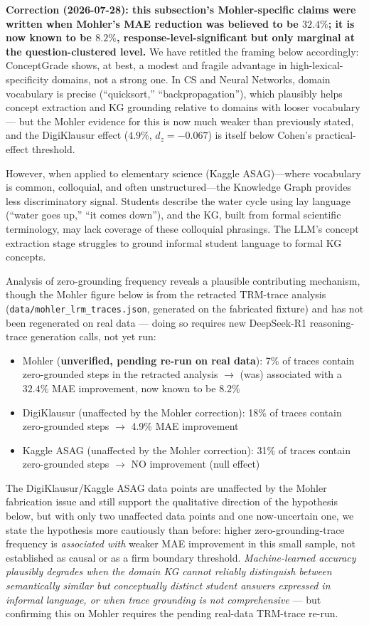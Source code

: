 \documentclass[journal,review]{vgtc}
\begin{document}
\textbf{Correction (2026-07-28): this subsection's Mohler-specific claims
were written when Mohler's MAE reduction was believed to be $32.4\%$; it
is now known to be $8.2\%$, response-level-significant but only marginal
at the question-clustered level.} We have retitled the framing below
accordingly: ConceptGrade shows, at best, a modest and fragile advantage
in high-lexical-specificity domains, not a strong one. In CS and Neural
Networks, domain vocabulary is precise (``quicksort,'' ``backpropagation''),
which plausibly helps concept extraction and KG grounding relative to
domains with looser vocabulary --- but the Mohler evidence for this is
now much weaker than previously stated, and the DigiKlausur effect
($4.9\%$, $d_z=-0.067$) is itself below Cohen's practical-effect
threshold.

However, when applied to elementary science (Kaggle ASAG)---where vocabulary is common, colloquial, and often unstructured---the Knowledge Graph provides less discriminatory signal. Students describe the water cycle using lay language (``water goes up,'' ``it comes down''), and the KG, built from formal scientific terminology, may lack coverage of these colloquial phrasings. The LLM's concept extraction stage struggles to ground informal student language to formal KG concepts.

Analysis of zero-grounding frequency reveals a plausible contributing mechanism, though the Mohler figure below is from the retracted TRM-trace analysis (\texttt{data/mohler\_lrm\_traces.json}, generated on the fabricated fixture) and has not been regenerated on real data --- doing so requires new DeepSeek-R1 reasoning-trace generation calls, not yet run:
\begin{itemize}
  \item Mohler (\textbf{unverified, pending re-run on real data}): 7\% of traces contain zero-grounded steps in the retracted analysis $\rightarrow$ (was) associated with a $32.4\%$ MAE improvement, now known to be $8.2\%$
  \item DigiKlausur (unaffected by the Mohler correction): 18\% of traces contain zero-grounded steps $\rightarrow$ 4.9\% MAE improvement
  \item Kaggle ASAG (unaffected by the Mohler correction): 31\% of traces contain zero-grounded steps $\rightarrow$ NO improvement (null effect)
\end{itemize}

The DigiKlausur/Kaggle ASAG data points are unaffected by the Mohler
fabrication issue and still support the qualitative direction of the
hypothesis below, but with only two unaffected data points and one
now-uncertain one, we state the hypothesis more cautiously than before:
higher zero-grounding-trace frequency is \emph{associated with} weaker
MAE improvement in this small sample, not established as causal or as a
firm boundary threshold. \textit{Machine-learned accuracy plausibly
degrades when the domain KG cannot reliably distinguish between
semantically similar but conceptually distinct student answers expressed
in informal language, or when trace grounding is not comprehensive} ---
but confirming this on Mohler requires the pending real-data TRM-trace
re-run.
\end{document}
